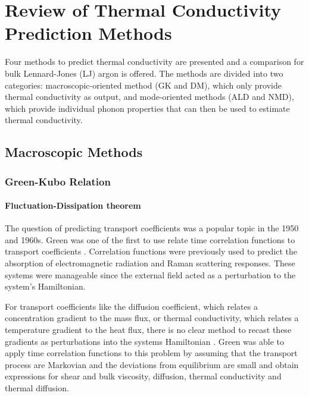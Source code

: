 \chapter{Review of Thermal Conductivity Prediction Methods}\label{CHP:background}
Four methods to predict thermal conductivity are presented and a comparison for bulk Lennard-Jones (LJ) argon is offered. The methods are divided into two categories: macroscopic-oriented method (GK and DM), which only provide thermal conductivity as output, and mode-oriented methods (ALD and NMD), which provide individual phonon properties that can then be used to estimate thermal conductivity.

\section{Macroscopic Methods}
\subsection{Green-Kubo Relation}
\subsubsection{Fluctuation-Dissipation theorem}

The question of predicting transport coefficients was a popular topic in the 1950 and 1960s. Green was one of the first to use relate time correlation functions to transport coefficients \cite{green1954markoff}. Correlation functions were previously used to predict the absorption of electromagnetic radiation \cite{gordon1968correlation} and Raman scattering responses\cite{gordon1965molecular}. These systems were manageable since the external field acted as a perturbation to the system's Hamiltonian.

For transport coefficients like the diffusion coefficient, which relates a concentration gradient to the mass flux, or thermal conductivity, which relates a temperature gradient to the heat flux, there is no clear method to recast these gradients as perturbations into the systems Hamiltonian \cite {mcquarrie2000statistical}. Green was able to apply time correlation functions to this problem by assuming that the transport process are Markovian and the deviations from equilibrium are small \cite{green1954markoff} and obtain expressions for shear and bulk viscosity, diffusion, thermal conductivity and thermal diffusion.

